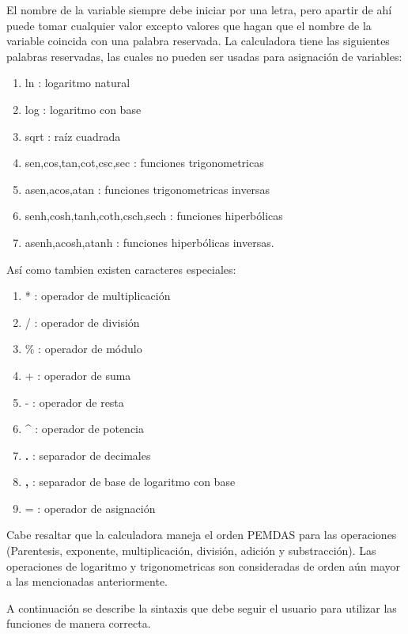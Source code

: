 \documentclass[10pt]{report}
\begin{document}
El nombre de la variable siempre debe iniciar por una letra, pero apartir de ahí puede tomar cualquier valor excepto valores que hagan que el nombre de la variable coincida con una palabra reservada. La calculadora tiene las siguientes palabras reservadas, las cuales no pueden ser usadas para asignación de variables:
\begin{enumerate}
    \item ln : logaritmo natural
    \item log : logaritmo con base
    \item sqrt : raíz cuadrada
    \item sen,cos,tan,cot,csc,sec : funciones trigonometricas
    \item asen,acos,atan : funciones trigonometricas inversas
    \item senh,cosh,tanh,coth,csch,sech : funciones hiperbólicas
    \item asenh,acosh,atanh : funciones hiperbólicas inversas.
\end{enumerate}
Así como tambien existen caracteres especiales:
\begin{enumerate}
    \item * : operador de multiplicación
    \item / : operador de división
    \item \% : operador de módulo
    \item + : operador de suma
    \item - : operador de resta
    \item \textbf{\^} : operador de potencia
    \item \textbf{.} : separador de decimales
    \item \textbf{,} : separador de base de logaritmo con base
    \item = : operador de asignación
\end{enumerate}
Cabe resaltar que la calculadora maneja el orden PEMDAS para las operaciones (Parentesis, exponente, multiplicación, división, adición y substracción). Las operaciones de logaritmo y trigonometricas son consideradas de orden aún mayor a las mencionadas anteriormente.

A continuación se describe la sintaxis que debe seguir el usuario para utilizar las funciones de manera correcta.
\end{document}
